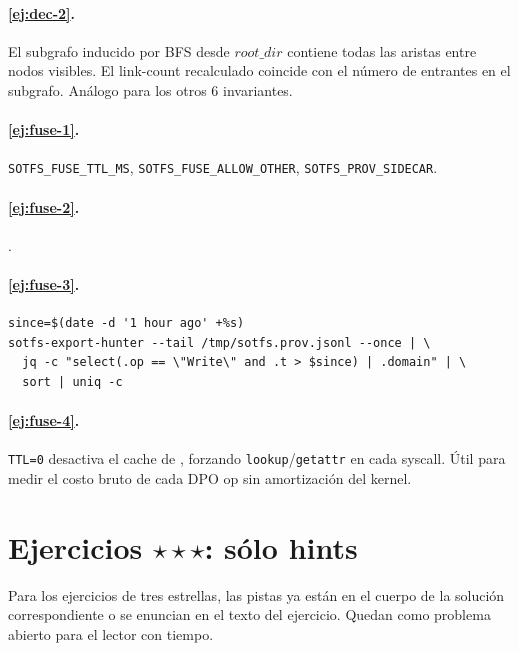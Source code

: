 \paragraph{\ref{ej:dec-2}.} El subgrafo inducido por BFS desde
$\mathit{root\_dir}$ contiene todas las aristas \econtains{} entre
nodos visibles. El link-count recalculado coincide con el número de
\econtains{} entrantes en el subgrafo. Análogo para los otros 6
invariantes.

\paragraph{\ref{ej:fuse-1}.} \texttt{SOTFS\_FUSE\_TTL\_MS},
\texttt{SOTFS\_FUSE\_ALLOW\_OTHER}, \texttt{SOTFS\_PROV\_SIDECAR}.

\paragraph{\ref{ej:fuse-2}.} \oprename.

\paragraph{\ref{ej:fuse-3}.}
\begin{lstlisting}[language=shellcmd]
since=$(date -d '1 hour ago' +%s)
sotfs-export-hunter --tail /tmp/sotfs.prov.jsonl --once | \
  jq -c "select(.op == \"Write\" and .t > $since) | .domain" | \
  sort | uniq -c
\end{lstlisting}

\paragraph{\ref{ej:fuse-4}.} \texttt{TTL=0} desactiva el cache de
\fuse{}, forzando \texttt{lookup}/\texttt{getattr} en cada syscall.
Útil para medir el costo bruto de cada DPO op sin amortización del
kernel.

\section*{Ejercicios \texorpdfstring{$\star\star\star$}{tres-estrellas}: sólo hints}

Para los ejercicios de tres estrellas, las pistas ya están en el
cuerpo de la solución correspondiente o se enuncian en el texto del
ejercicio. Quedan como problema abierto para el lector con tiempo.
